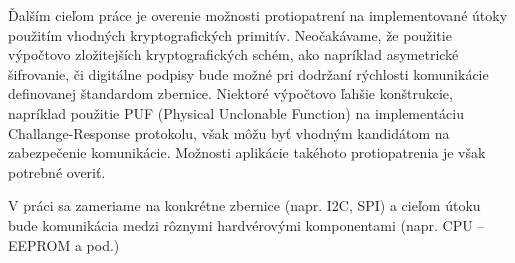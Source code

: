 Ďalším cieľom práce je overenie možnosti protiopatrení na implementované útoky použitím vhodných kryptografických primitív. Neočakávame, že použitie výpočtovo zložitejších kryptografických schém, ako napríklad asymetrické šifrovanie, či digitálne podpisy bude možné pri dodržaní rýchlosti komunikácie definovanej štandardom zbernice. Niektoré výpočtovo ľahšie konštrukcie, napríklad použitie PUF (Physical Unclonable Function) na implementáciu Challange-Response protokolu, však môžu byť vhodným kandidátom na zabezpečenie komunikácie. Možnosti aplikácie takéhoto protiopatrenia je však potrebné overiť.

V práci sa zameriame na konkrétne zbernice (napr. I2C, SPI) a cieľom útoku bude komunikácia medzi rôznymi hardvérovými komponentami (napr. CPU -- EEPROM a pod.)